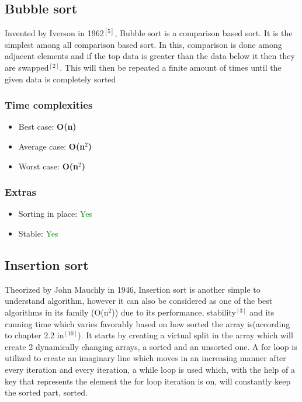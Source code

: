 \documentclass{article}
\begin{document}
\bigskip
\begin{multicols}{2}
\titlespacing*{\subsection}
  {0pt}{4\baselineskip}{1.5\baselineskip}
  
\subsection{Bubble sort}

Invented by Iverson in 1962$^{[5]}$, Bubble sort is a comparison based sort. It is the simplest among all comparison based sort. In this, comparison is done among adjacent elements and if the top data is greater than the data below it then they are swapped$^{[2]}$. This will then be repeated a finite amount of times until the given data is completely sorted

\subsubsection{Time complexities}
\begin{itemize}
    \item Best case: \textbf{O(n)}
    \item Average case: \textbf{O(n$^2$)}
    \item Worst case: \textbf{O(n$^2$)}
\end{itemize}

\subsubsection{Extras}
\begin{itemize}
    \item Sorting in place: \textcolor{green}{Yes}
    \item Stable: \textcolor{green}{Yes}
\end{itemize}

\bigbreak \bigbreak \bigbreak \bigbreak \bigbreak \bigbreak \bigbreak \bigbreak \bigbreak \bigbreak \bigbreak \bigbreak



\subsection{Insertion sort}
Theorized by John Mauchly in 1946, Insertion sort is another simple to understand algorithm, however it can also be considered as one of the best algorithms in its family (O(n$^2$)) due to its performance, stability$^{[3]}$ and its running time which varies favorably based on how sorted the array is(according to chapter 2.2 in$^{[10]}$). It starts by creating a virtual split in the array which will create 2 dynamically changing arrays, a sorted and an unsorted one. A for loop is utilized to create an imaginary line which moves in an increasing manner after every iteration and every iteration, a while loop is used which, with the help of a key that represents the element the for loop iteration is on, will constantly keep the sorted part, sorted. 

\end{multicols}
\end{document}
